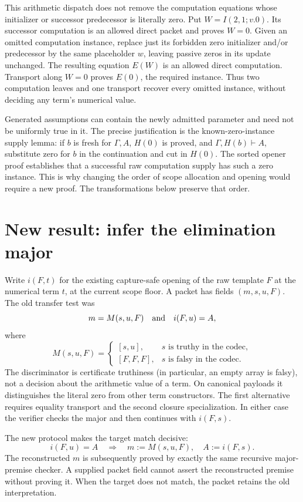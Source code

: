 \documentclass[11pt,letterpaper]{article}
\theoremstyle{definition}
\begin{document}
This arithmetic dispatch does not remove the computation equations whose
initializer or successor predecessor is literally zero. Put
$W=I(2,1;v.0)$. Its successor computation is an allowed direct packet and
proves $W=0$. Given an omitted computation instance, replace just its
forbidden zero initializer and/or predecessor by the same placeholder
$w$, leaving passive zeros in its update unchanged. The resulting
equation $E(W)$ is an allowed direct computation. Transport along $W=0$
proves $E(0)$, the required instance. Thus two computation leaves and one
transport recover every omitted instance, without deciding any term's
numerical value.

Generated assumptions can contain the newly admitted parameter and need
not be uniformly true in it. The precise justification is the
known-zero-instance supply lemma: if $b$ is fresh for $\Gamma,A$,
$H(0)$ is proved, and $\Gamma,H(b)\vdash A$, substitute zero for $b$
in the continuation and cut in $H(0)$. The sorted opener proof establishes
that a successful raw computation supply has such a zero instance.
This is why changing the order of scope allocation and opening would
require a new proof. The transformations below preserve that order.

\section{New result: infer the elimination major}
\label{sec:inferred}

Write $i(F,t)$ for the existing capture-safe opening of the raw template
$F$ at the numerical term $t$, at the current scope floor. A packet has
fields $(m,s,u,F)$. The old transfer test was
\[
 m=M(s,u,F)\quad\hbox{and}\quad i(F,u)=A,
\]
where
\[
 M(s,u,F)=
 \begin{cases}
 [s,u],&s\text{ is truthy in the codec},\\
 [F,F,F],&s\text{ is falsy in the codec}.
 \end{cases}
\]
The discriminator is certificate truthiness (in particular, an empty
array is falsy), not a decision about the arithmetic value of a term.
On canonical payloads it distinguishes the literal zero from other term
constructors. The first alternative requires equality transport and the
second closure specialization. In either case the verifier checks the major and then
continues with $i(F,s)$.

The new protocol makes the target match decisive:
\[
 \boxed{\ i(F,u)=A\quad\Longrightarrow\quad
       m:=M(s,u,F),\quad A:=i(F,s).\ }
\]
The reconstructed $m$ is subsequently proved by exactly the same recursive
major-premise checker. A supplied packet field cannot assert the
reconstructed premise without proving it. When the target does not match,
the packet retains the old interpretation.
\end{document}

